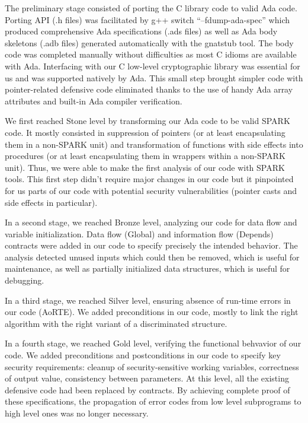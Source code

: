 \documentclass{llncs}
\begin{document}
The preliminary stage consisted of porting the C library code to valid Ada
code. Porting API (.h files) was facilitated by g++ switch ``–fdump-ada-spec''
which produced comprehensive Ada specifications (.ads files) as well as Ada
body skeletons (.adb files) generated automatically with the gnatstub tool. The
body code was completed manually without difficulties as most C idioms are
available with Ada. Interfacing with our C low-level cryptographic library was
essential for us and was supported natively by Ada. This small step brought
simpler code with pointer-related defensive code eliminated thanks to the use
of handy Ada array attributes and built-in Ada compiler verification.

We first reached Stone level by transforming our Ada code to be valid SPARK
code. It mostly consisted in suppression of pointers (or at least encapsulating
them in a non-SPARK unit) and transformation of functions with side effects
into procedures (or at least encapsulating them in wrappers within a non-SPARK
unit). Thus, we were able to make the first analysis of our code with SPARK
tools. This first step didn't require major changes in our code but it
pinpointed for us parts of our code with potential security vulnerabilities
(pointer casts and side effects in particular).

In a second stage, we reached Bronze level, analyzing our code for data flow
and variable initialization. Data flow (Global) and information flow (Depends)
contracts were added in our code to specify precisely the intended
behavior. The analysis detected unused inputs which could then be removed,
which is useful for maintenance, as well as partially initialized data
structures, which is useful for debugging.

In a third stage, we reached Silver level, ensuring absence of run-time errors
in our code (AoRTE). We added preconditions in our code, mostly to link the
right algorithm with the right variant of a discriminated structure.

In a fourth stage, we reached Gold level, verifying the functional behvavior of
our code.  We added preconditions and postconditions in our code to specify key
security requirements: cleanup of security-sensitive working variables,
correctness of output value, consistency between parameters. At this level, all
the existing defensive code had been replaced by contracts. By achieving
complete proof of these specifications, the propagation of error codes from low
level subprograms to high level ones was no longer necessary.
\end{document}
